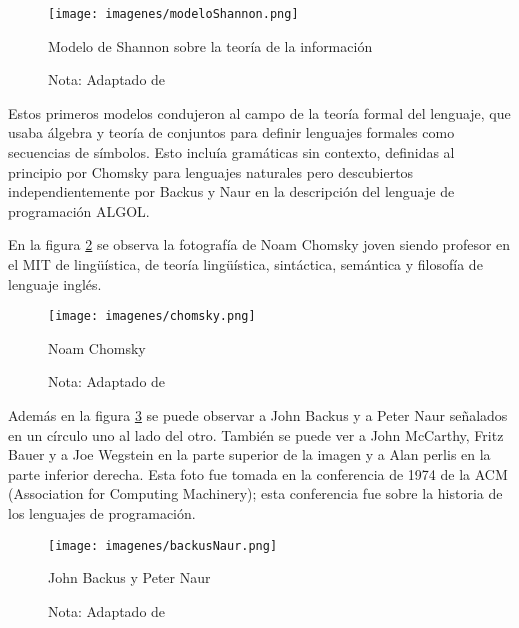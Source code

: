 \documentclass[12pt]{article}
\begin{document}
			
			
			\begin{figure}[H]
				\texttt{[image: imagenes/modeloShannon.png]}
				\centering
				\caption{Modelo de Shannon sobre la teoría de la información}
				\caption*{\small Nota: Adaptado de  \cite{Nizami2015}}
				\label{fig:modeloShannon}
			\end{figure}
			
			
			Estos primeros modelos condujeron al campo de la teoría formal del lenguaje, que usaba álgebra y teoría de conjuntos para definir lenguajes formales como secuencias de símbolos. Esto incluía gramáticas sin contexto, definidas al principio por Chomsky para lenguajes naturales pero descubiertos independientemente por Backus y Naur en la descripción del lenguaje de programación ALGOL.\cite{Kumar2011}
			
			En la figura \ref{fig:chomsky} se observa la fotografía de Noam Chomsky joven siendo profesor en el MIT de lingüística, de teoría lingüística, sintáctica, semántica y filosofía de lenguaje inglés.			
			
			\begin{figure}[h]
				\texttt{[image: imagenes/chomsky.png]}
				\centering
				\caption{Noam Chomsky}
				\caption*{\small Nota: Adaptado de  \cite{UMBC2004}}
				\label{fig:chomsky}
			\end{figure}		
			
			Además en la figura \ref{fig:BackusNaur} se puede observar a John Backus y a Peter Naur señalados en un círculo uno al lado del otro. También se puede ver a John McCarthy, Fritz Bauer y a Joe Wegstein en la parte superior de la imagen y a Alan perlis en la parte inferior derecha. Esta foto fue tomada en la conferencia de 1974 de la ACM (Association for Computing Machinery); esta conferencia fue sobre la historia de los lenguajes de programación. 
		
			\begin{figure}[H]
				\texttt{[image: imagenes/backusNaur.png]}
				\centering
				\caption{John Backus y Peter Naur}
				\caption*{\small Nota: Adaptado de  \cite{UMBC2004}}
				\label{fig:BackusNaur}
			\end{figure}
			
\end{document}
